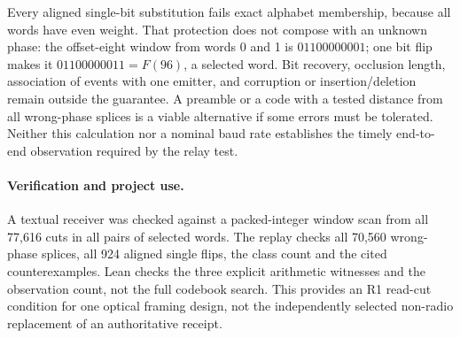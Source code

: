 \documentclass{article}
\begin{document}
Every aligned single-bit substitution fails exact alphabet membership,
because all words have even weight. That protection does not compose
with an unknown phase: the offset-eight window from words 0 and 1 is
\(01100000001\); one bit flip makes it \(01100000011=F(96)\), a
selected word. Bit recovery, occlusion length, association of events
with one emitter, and corruption or insertion/deletion remain outside the
guarantee. A preamble or a code with a tested distance from all
wrong-phase splices is a viable alternative if some errors must be
tolerated. Neither this calculation nor a nominal baud rate establishes
the timely end-to-end observation required by the relay test.

\paragraph{Verification and project use.}
A textual receiver was checked against a packed-integer window scan
from all 77,616 cuts in all pairs of selected words. The replay checks
all 70,560 wrong-phase splices, all 924 aligned single flips, the
class count and the cited counterexamples. Lean checks the three
explicit arithmetic witnesses and the observation count, not the full
codebook search. This provides an R1 read-cut condition for one optical
framing design, not the independently selected non-radio replacement of
an authoritative receipt.
\end{document}
